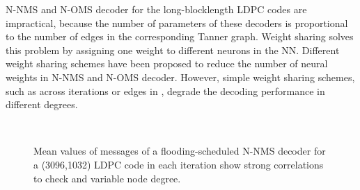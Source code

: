 \documentclass [PhD] {uclathes}
\begin{document}
N-NMS and N-OMS decoder for the long-blocklength LDPC codes are impractical, because the number of parameters of these decoders is proportional to the number of edges in the corresponding Tanner graph. Weight sharing \cite{xie2021weight} solves this problem by assigning one weight to different neurons in the NN. Different weight sharing schemes have been proposed to reduce the number of neural weights in N-NMS and N-OMS decoder. However, simple weight sharing schemes, such as across iterations or edges in \cite{Wang2020-fb,Lian2019-jh}, degrade the decoding performance in different degrees. 
\begin{figure}[hp]
    \centering
    \\
  \caption{Mean values of messages of a flooding-scheduled N-NMS decoder for a (3096,1032) LDPC code in each iteration show strong correlations to check and variable node degree.}
   \label{fig: weights_evaluation}
\end{figure}
\end{document}
